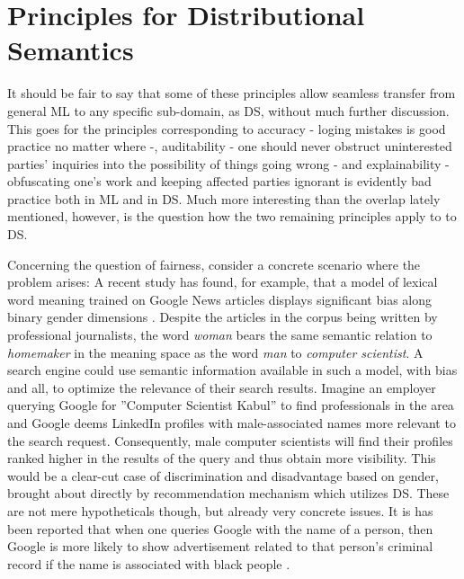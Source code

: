 \documentclass{article}
\begin{document}
\section{Principles for Distributional Semantics}\hypertarget{sec4}{}
It should be fair to say that some of these principles allow seamless transfer from general ML to any specific sub-domain, as DS, without much further discussion.
This goes for the principles corresponding to accuracy - loging mistakes is good practice no matter where -, auditability - one should never obstruct uninterested parties' inquiries into the possibility of things going wrong - and explainability - obfuscating one's work and keeping affected parties ignorant is evidently bad practice both in ML and in DS.
Much more interesting than the overlap lately mentioned, however, is the question how the two remaining principles apply to to DS.

Concerning the question of fairness, consider a concrete scenario where the problem arises: A recent study has found, for example, that a model of lexical word meaning trained on Google News articles displays significant bias along binary gender dimensions \cite{bolukbasi2016man}. Despite the articles in the corpus being written by professional journalists, the word \emph{woman} bears the same semantic relation to \emph{homemaker} in the meaning space as the word \emph{man} to \emph{computer scientist}. A search engine could use semantic information available in such a model, with bias and all, to optimize the relevance of their search results. Imagine an employer querying Google for ''Computer Scientist Kabul'' to find professionals in the area and Google deems LinkedIn profiles with male-associated names more relevant to the search request. Consequently, male computer scientists will find their profiles ranked higher in the results of the query and thus obtain more visibility. This would be a clear-cut case of discrimination and disadvantage based on gender, brought about directly by recommendation mechanism which utilizes DS. These are not mere hypotheticals though, but already very concrete issues. It is has been reported that when one queries Google with the name of a person, then Google is more likely to show advertisement related to that person's criminal record if the name is associated with black people \cite{sweeney2013discrimination}.
\end{document}
